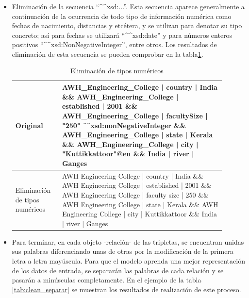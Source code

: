 \begin{itemize}
    
    \item Eliminación de la secuencia ``\^{}\^{}xsd:...''. Esta secuencia aparece generalmente a continuación de la ocurrencia de todo tipo de información numérica como fechas de nacimiento, distancias y etcétera, y se utilizan para denotar su tipo concreto; así para fechas se utilizará ``\^{}\^{}xsd:date'' y para números enteros positivos ``\^{}\^{}xsd:NonNegativeInteger'', entre otros. Los resultados de eliminación de esta secuencia se pueden comprobar en la tabla\ref{tab:clean_xsd}.
    
    
    \begin{table}[h!]
    \begin{center}
    \begin{tabular}{p{0.2\linewidth} | p{0.7\linewidth}}
    Original & AWH\_Engineering\_College | country | India \&\& AWH\_Engineering\_College | established | 2001 \&\& AWH\_Engineering\_College | facultySize | "250" \textcolor{codepurple}{\^{}\^{}xsd:nonNegativeInteger} \&\& AWH\_Engineering\_College | state | Kerala \&\& AWH\_Engineering\_College | city | "Kuttikkattoor"@en \&\& India | river | Ganges\\ \hline
    Eliminación de tipos numéricos & AWH Engineering College | country | India \&\& AWH Engineering College | established | 2001 \&\& AWH Engineering College | faculty size | 250 \&\& AWH Engineering College | state | Kerala \&\& AWH Engineering College | city |  Kuttikkattoor \&\& India | river | Ganges \\
    \end{tabular}
    \caption{Eliminación de tipos numéricos}
    \label{tab:clean_xsd}
    \end{center}
    \end{table}
    
    
    \item Para terminar, en cada objeto -relación-  de las tripletas, se encuentran unidas sus palabras diferenciando unas de otras por la modificación de la primera letra a letra mayúscula. Para que el modelo aprenda una mejor representación de los datos de entrada, se separarán las palabras de cada relación y se pasarán a minúsculas completamente. En el ejemplo de la tabla \ref{tab:clean_separar} se muestran los resultados de realización de este proceso.
    

\end{itemize}
